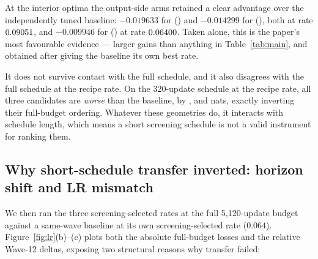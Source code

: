 At the interior optima the output-side arms retained a clear advantage over the
independently tuned baseline: $-0.019633$ for  (\alldiag{}) and
$-0.014299$ for  (\outerdiag{}), both at rate
$0.09051{}$, and $-0.009946$ for  (\fused{}) at
rate $0.06400{}$. Taken alone, this is the paper's most
favourable evidence --- larger gains than anything in Table~\ref{tab:main}, and
obtained after giving the baseline its own best rate.

It does not survive contact with the full schedule, and it also disagrees with
the full schedule at the recipe rate. On the 320-update schedule at the recipe
rate, all three candidates are \emph{worse} than the baseline, by
\shortBaseInnerOuterLeftdiag{}, \shortBaseOuterLeftdiag{} and
\shortBaseOuterLeftdiagFused{} nats, exactly inverting their full-budget
ordering. Whatever these geometries do, it interacts with schedule length,
which means a short screening schedule is not a valid instrument for ranking
them.

\subsection{Why short-schedule transfer inverted: horizon shift and LR mismatch}
\label{sec:tuning-why}

We then ran the three screening-selected rates at the full 5{,}120-update budget
against a same-wave baseline at its own screening-selected rate ($0.064$).
Figure~\ref{fig:lr}(b)--(c) plots both the absolute full-budget losses and the
relative Wave-12 deltas, exposing two structural reasons why transfer failed:

